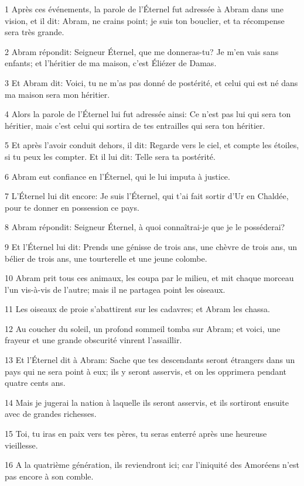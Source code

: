 \par 1 Après ces événements, la parole de l'Éternel fut adressée à Abram dans une vision, et il dit: Abram, ne crains point; je suis ton bouclier, et ta récompense sera très grande.
\par 2 Abram répondit: Seigneur Éternel, que me donneras-tu? Je m'en vais sans enfants; et l'héritier de ma maison, c'est Éliézer de Damas.
\par 3 Et Abram dit: Voici, tu ne m'as pas donné de postérité, et celui qui est né dans ma maison sera mon héritier.
\par 4 Alors la parole de l'Éternel lui fut adressée ainsi: Ce n'est pas lui qui sera ton héritier, mais c'est celui qui sortira de tes entrailles qui sera ton héritier.
\par 5 Et après l'avoir conduit dehors, il dit: Regarde vers le ciel, et compte les étoiles, si tu peux les compter. Et il lui dit: Telle sera ta postérité.
\par 6 Abram eut confiance en l'Éternel, qui le lui imputa à justice.
\par 7 L'Éternel lui dit encore: Je suis l'Éternel, qui t'ai fait sortir d'Ur en Chaldée, pour te donner en possession ce pays.
\par 8 Abram répondit: Seigneur Éternel, à quoi connaîtrai-je que je le posséderai?
\par 9 Et l'Éternel lui dit: Prends une génisse de trois ans, une chèvre de trois ans, un bélier de trois ans, une tourterelle et une jeune colombe.
\par 10 Abram prit tous ces animaux, les coupa par le milieu, et mit chaque morceau l'un vis-à-vis de l'autre; mais il ne partagea point les oiseaux.
\par 11 Les oiseaux de proie s'abattirent sur les cadavres; et Abram les chassa.
\par 12 Au coucher du soleil, un profond sommeil tomba sur Abram; et voici, une frayeur et une grande obscurité vinrent l'assaillir.
\par 13 Et l'Éternel dit à Abram: Sache que tes descendants seront étrangers dans un pays qui ne sera point à eux; ils y seront asservis, et on les opprimera pendant quatre cents ans.
\par 14 Mais je jugerai la nation à laquelle ils seront asservis, et ils sortiront ensuite avec de grandes richesses.
\par 15 Toi, tu iras en paix vers tes pères, tu seras enterré après une heureuse vieillesse.
\par 16 A la quatrième génération, ils reviendront ici; car l'iniquité des Amoréens n'est pas encore à son comble.
